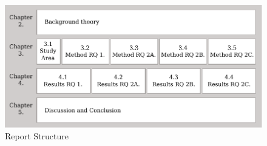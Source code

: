 \begin{figure}[hbp]
\includegraphics[width=\textwidth]{img/I4_ReportStructure.pdf}
\centering
\caption{Report Structure}\label{reportstruct}
\end{figure}
